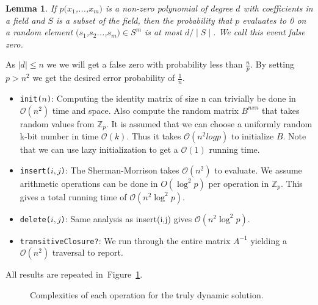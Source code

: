 \documentclass[a4paper,oneside,article,11pt]{memoir}
\newtheorem{lemma}{Lemma}
\begin{document}
\begin{lemma}
\label{lma:zippelSchwarz}
If $p(x_1$,...,$x_m)$ is a non-zero polynomial of degree $d$ with coefficients in a field and $S$ is a subset of the field, then the probability that $p$ evaluates to 0 on a random element $(s_1$,$s_2$...,$s_m) \in S^m$ is at most $d/\mid S \mid$. We call this event false zero.
\end{lemma}

As $\mid d \mid \leq n$ we we will get a false zero with probability less than $\frac{n}{p}$. By setting $p > n^2$ we get the desired error probability of $\frac{1}{n}$.

\begin{itemize}
\item{\texttt{init($n$)}: Computing the identity matrix of size n can trivially be done in $\mathcal{O}(n^2)$ time and space. Also compute the random matrix $B^{nxn}$ that takes random values from $\mathbb{Z}_p$. It is assumed that we can choose a uniformly random k-bit number in time $\mathcal{O}(k)$. Thus it takes $\mathcal{O}(n^2 log p)$ to initialize $B$. Note that we can use lazy initialization to get a $\mathcal{O}(1)$ running time.}
\item{\texttt{insert($i,j$)}: The Sherman-Morrison takes $\mathcal{O}(n^2)$ to evaluate. We assume arithmetic operations can be done in $O(\log^2 p)$ per operation in $\mathbb{Z}_p$. This gives a total running time of $\mathcal{O}(n^2 \log^2 p)$.}
\item{\texttt{delete($i,j$)}: Same analysis as insert(i,j) gives $\mathcal{O}(n^2 \log^2 p)$.}
\item{\texttt{transitiveClosure?}: We run through the entire matrix $A^{-1}$ yielding a $\mathcal{O}(n^2)$ traversal to report.}
\end{itemize}

All results are repeated in~Figure~\ref{fig:truly-comp}.

\begin{figure}[h]
\caption{Complexities of each operation for the truly dynamic solution.}
\label{fig:truly-comp}
\end{figure}
\end{document}
